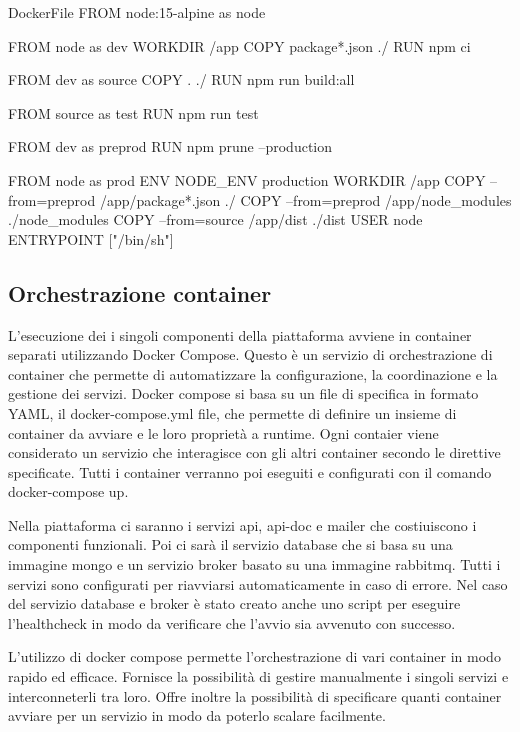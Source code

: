 \begin{docker}[label={lst:DockerFile}]{DockerFile}
    FROM node:15-alpine as node

    FROM node as dev
    WORKDIR /app
    COPY package*.json ./
    RUN npm ci
    
    FROM dev as source
    COPY . ./
    RUN npm run build:all

    FROM source as test
    RUN npm run test

    FROM dev as preprod
    RUN npm prune --production

    FROM node as prod
    ENV NODE_ENV production
    WORKDIR /app
    COPY --from=preprod /app/package*.json ./
    COPY --from=preprod /app/node_modules ./node_modules
    COPY --from=source /app/dist ./dist
    USER node
    ENTRYPOINT ["/bin/sh"]

\end{docker}

\subsection{Orchestrazione container}
L'esecuzione dei i singoli componenti della piattaforma avviene in container separati utilizzando Docker Compose.
Questo è un servizio di orchestrazione di container che permette di automatizzare la configurazione, la coordinazione
e la gestione dei servizi. Docker compose si basa su un file di specifica in formato YAML, il docker-compose.yml file, che
permette di definire un insieme di container da avviare e le loro proprietà a runtime.
Ogni contaier viene considerato un servizio che interagisce con gli altri container secondo
le direttive specificate. Tutti i container verranno poi eseguiti e configurati con il comando docker-compose up.

Nella piattaforma ci saranno i servizi api, api-doc e mailer che costiuiscono i componenti funzionali.
Poi ci sarà il servizio database che si basa su una immagine mongo e un servizio broker basato su una immagine rabbitmq.
Tutti i servizi sono configurati per riavviarsi automaticamente in caso di errore. Nel caso del servizio database e broker è stato
creato anche uno script per eseguire l'healthcheck in modo da verificare che l'avvio sia avvenuto con successo.

L'utilizzo di docker compose permette l'orchestrazione di vari container in modo rapido ed efficace. Fornisce la possibilità
di gestire manualmente i singoli servizi e interconneterli tra loro. Offre inoltre la possibilità di specificare quanti container
avviare per un servizio in modo da poterlo scalare facilmente.


